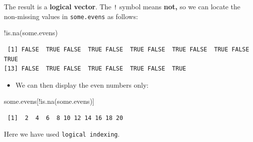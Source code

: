 \documentclass[
  9pt,
  a4paper,
  ignorenonframetext,
  notheorems]{beamer}
\newenvironment{Shaded}{\begin{snugshade}}{\end{snugshade}}
\newcommand{\FunctionTok}[1]{\textcolor[rgb]{0.28,0.35,0.67}{#1}}
\newcommand{\NormalTok}[1]{\textcolor[rgb]{0.00,0.23,0.31}{#1}}
\newcommand{\SpecialCharTok}[1]{\textcolor[rgb]{0.37,0.37,0.37}{#1}}
\providecommand{\tightlist}{%
  \setlength{\itemsep}{0pt}\setlength{\parskip}{0pt}}\usepackage{longtable,booktabs,array}
\begin{document}
\begin{frame}[fragile]
The result is a \textbf{logical vector}. The \texttt{!} symbol means
\textbf{not,} so we can locate the non-missing values in
\texttt{some.evens} as follows:

\begin{Shaded}
\begin{Highlighting}[]
\SpecialCharTok{!}\FunctionTok{is.na}\NormalTok{(some.evens)}
\end{Highlighting}
\end{Shaded}

\begin{verbatim}
 [1] FALSE  TRUE FALSE  TRUE FALSE  TRUE FALSE  TRUE FALSE  TRUE FALSE  TRUE
[13] FALSE  TRUE FALSE  TRUE FALSE  TRUE FALSE  TRUE
\end{verbatim}

\begin{itemize}
\tightlist
\item
  We can then display the even numbers only:
\end{itemize}

\begin{Shaded}
\begin{Highlighting}[]
\NormalTok{some.evens[}\SpecialCharTok{!}\FunctionTok{is.na}\NormalTok{(some.evens)]}
\end{Highlighting}
\end{Shaded}

\begin{verbatim}
 [1]  2  4  6  8 10 12 14 16 18 20
\end{verbatim}

Here we have used \texttt{logical\ indexing}.
\end{frame}
\end{document}
